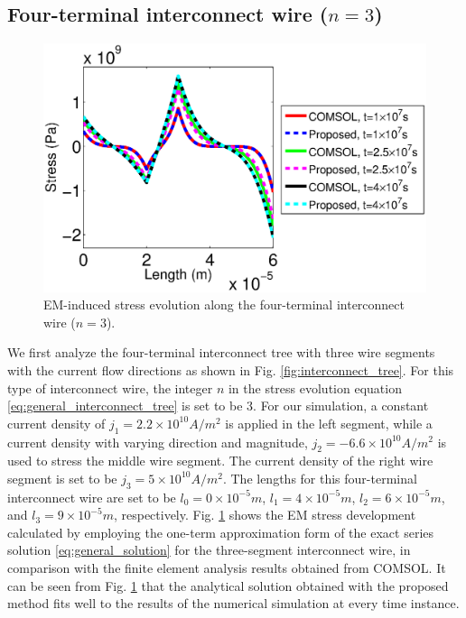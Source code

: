 \subsection{Four-terminal interconnect wire ($n=3$)}
\begin{figure}[!h]
\centering
\includegraphics[width=0.9\columnwidth]{S3StressMatComCompareT0.eps}
\caption{EM-induced stress evolution along the four-terminal interconnect wire ($n=3$).}
\label{fig:S3StressMatComCompare}
\end{figure}
We first analyze the four-terminal interconnect tree with three wire segments with the current flow directions as shown in Fig. \ref{fig:interconnect_tree}. For this type of interconnect wire, the integer $n$ in the stress evolution equation \eqref{eq:general_interconnect_tree} is set to be 3. For our simulation, a constant current density of $j_1=2.2\times 10^{10}A/m^2$ is applied in the left segment, while a current density with varying direction and magnitude, $j_2=-6.6\times 10^{10}A/m^2$ is used to stress the middle wire segment. The current density of the right wire segment is set to be $j_3=5\times 10^{10}A/m^2$. The lengths for this four-terminal interconnect wire are set to be $l_0=0\times 10^{-5}m$, $l_1=4\times 10^{-5}m$, $l_2=6\times 10^{-5}m$, and $l_3=9\times 10^{-5}m$, respectively. Fig. \ref{fig:S3StressMatComCompare} shows the EM stress development calculated by employing the one-term approximation form of the exact series solution \eqref{eq:general_solution} for the three-segment interconnect wire, in comparison with the finite element analysis results obtained from COMSOL. It can be seen from Fig. \ref{fig:S3StressMatComCompare} that the analytical solution obtained with the proposed method fits well to the results of the numerical simulation at every time instance.

